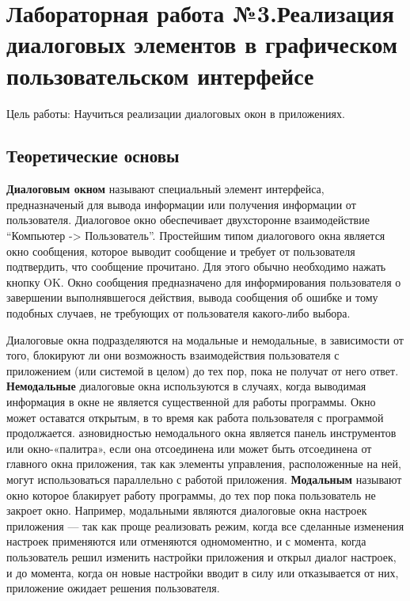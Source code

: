 \documentclass[a4paper]{article}
\begin{document}
\newpage
\section{Лабораторная работа №3.\newline Реализация диалоговых элементов в графическом пользовательском интерфейсе}

Цель работы: Научиться реализации диалоговых окон в приложениях.

\subsection{Теоретические основы}

\textbf{Диалоговым окном} называют специальный элемент интерфейса, предназначеный для вывода информации или получения информации от пользователя. Диалоговое окно обеспечивает двухсторонне взаимодействие ``Компьютер -> Пользователь''. Простейшим типом диалогового окна является окно сообщения, которое выводит сообщение и требует от пользователя подтвердить, что сообщение прочитано. Для этого обычно необходимо нажать кнопку OK. Окно сообщения предназначено для информирования пользователя о завершении выполнявшегося действия, вывода сообщения об ошибке и тому подобных случаев, не требующих от пользователя какого-либо выбора.

Диалоговые окна подразделяются на модальные и немодальные, в зависимости от того, блокируют ли они возможность взаимодействия пользователя с приложением (или системой в целом) до тех пор, пока не получат от него ответ. \textbf{Немодальные} диалоговые окна используются в случаях, когда выводимая информация в окне не является существенной для работы программы. Окно может оставатся открытым, в то время как работа пользователя с программой продолжается. азновидностью немодального окна является панель инструментов или окно-«палитра», если она отсоединена или может быть отсоединена от главного окна приложения, так как элементы управления, расположенные на ней, могут использоваться параллельно с работой приложения. \textbf{Модальным} называют окно которое блакирует работу программы, до тех пор пока пользователь не закроет окно. Например, модальными являются диалоговые окна настроек приложения — так как проще реализовать режим, когда все сделанные изменения настроек применяются или отменяются одномоментно, и с момента, когда пользователь решил изменить настройки приложения и открыл диалог настроек, и до момента, когда он новые настройки вводит в силу или отказывается от них, приложение ожидает решения пользователя.
\end{document}
